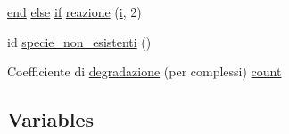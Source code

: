 \begin{DoxyCompactItemize}
$$\item 
\hyperlink{a00025_afb358f48b1646c750fb9da6c6585be2b}{end} \hyperlink{a00031_af5946383720aa572eb93e1e63afc23c2}{else} \hyperlink{a00030_a01d55766b8058903dd360b4bda71f9f5}{if} \hyperlink{a00068_a65cf6e12ba9a8c10222f3f1f71f7c95f}{reazione} (\hyperlink{a00071_ad3efca1ea6e3333daf30719ee0501862}{i}, 2)
\item 
id \hyperlink{a00068_adfcfd2749a68fa87ece8ec3caa194b3d}{specie\-\_\-non\-\_\-esistenti} ()
\item 
Coefficiente di \hyperlink{a00068_a43a55a4e9faae78b56ddd9e7ca41ba42}{degradazione} (per complessi) \hyperlink{a00068_aa0a4866d2600caeb20cfacee8eefc922}{count}
\end{DoxyCompactItemize}
\subsection*{Variables}
